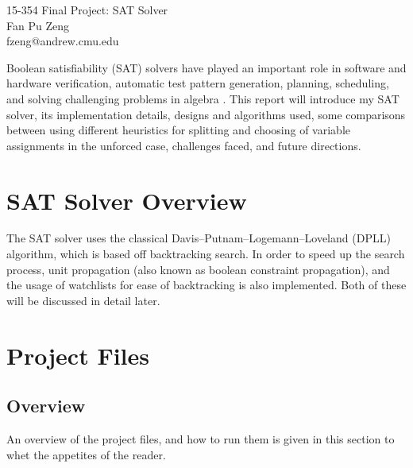 \documentclass[11pt]{article}
\makeatletter
\newcommand{\myname}{Fan Pu Zeng}
\newcommand{\myandrew}{fzeng@andrew.cmu.edu}
\makeatother
\begin{document}
\medskip                        %

\thispagestyle{plain}
\begin{center}                  %
{\Large 15-354 Final Project: SAT Solver} \\
\myname \\
\myandrew \\
\end{center}

Boolean satisfiability (SAT) solvers have played an important role in software and hardware verification, automatic test pattern generation, planning, scheduling, and solving challenging problems in algebra \cite{handbook}. This report will introduce my SAT solver, its implementation details, designs and algorithms used, some comparisons between using different heuristics for splitting and choosing of variable assignments in the unforced case, challenges faced, and future directions.

\section{SAT Solver Overview}
The SAT solver uses the classical Davis–Putnam–Logemann–Loveland (DPLL) algorithm, which is based off backtracking search. In order to speed up the search process, unit propagation (also known as boolean constraint propagation), and the usage of watchlists for ease of backtracking is also implemented. Both of these will be discussed in detail later.

\section{Project Files}
\subsection{Overview}
An overview of the project files, and how to run them is given in this section to whet the appetites of the reader.
\end{document}
